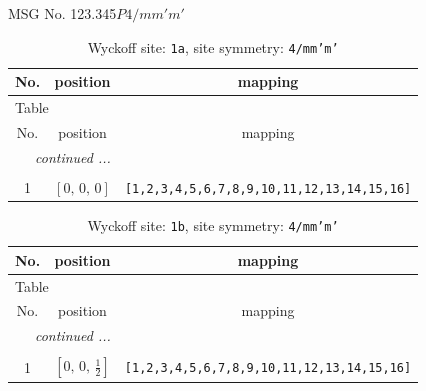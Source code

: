 \documentclass[fleqn,8pt]{jsarticle}
\begin{document}
\setcounter{MaxMatrixCols}{32}

\renewcommand{\tablename}{Table~}
\renewcommand{\figurename}{Figure~}
\begin{center}
\LARGE
MSG No. 123.345\quad$P4/mm'm'$
\end{center}
\renewcommand{\arraystretch}{1.2}
\begin{longtable}{ccc}
\caption{Wyckoff site: {\tt 1a}, site symmetry: {\tt 4/mm'm'}}
 \\
 \hline \hline
No. & position & mapping \\ \hline \endfirsthead

\multicolumn{2}{l}{\tablename\ \thetable{}} \\
 \hline \hline
No. & position & mapping \\ \hline \endhead

 \hline \hline
\multicolumn{2}{r}{\footnotesize\it continued ...} \\ \endfoot

 \hline \hline
\multicolumn{2}{r}{} \\ \endlastfoot

1 & $\left[ 0,\, 0,\, 0 \right]$ & {\tt [1,2,3,4,5,6,7,8,9,10,11,12,13,14,15,16]} \\
\end{longtable}
\renewcommand{\arraystretch}{1.2}
\begin{longtable}{ccc}
\caption{Wyckoff site: {\tt 1b}, site symmetry: {\tt 4/mm'm'}}
 \\
 \hline \hline
No. & position & mapping \\ \hline \endfirsthead

\multicolumn{2}{l}{\tablename\ \thetable{}} \\
 \hline \hline
No. & position & mapping \\ \hline \endhead

 \hline \hline
\multicolumn{2}{r}{\footnotesize\it continued ...} \\ \endfoot

 \hline \hline
\multicolumn{2}{r}{} \\ \endlastfoot

1 & $\left[ 0,\, 0,\, \frac{1}{2} \right]$ & {\tt [1,2,3,4,5,6,7,8,9,10,11,12,13,14,15,16]} \\
\end{longtable}
\renewcommand{\arraystretch}{1.2}
\end{document}
